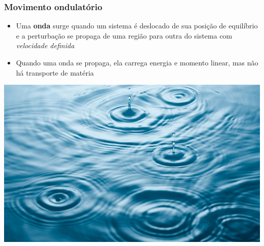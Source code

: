 \documentclass[t,%
brazilian,%
11pt,%
aspectratio=169,%
table%
]{beamer}
\begin{document}
\begin{frame}
    \frametitle{Movimento ondulatório}
    \begin{itemize}
        \item Uma \textbf{onda} surge quando um sistema é deslocado de sua posição de
            equilíbrio e a perturbação se propaga de uma região para outra do
            sistema com \textit{velocidade definida} 
        \item Quando uma onda se propaga, ela carrega energia e momento linear, mas
            não há transporte de matéria
    \end{itemize}
    \centering
    \includegraphics[height=\textheight-90pt]{images/ondas.png}
\end{frame}
\end{document}
